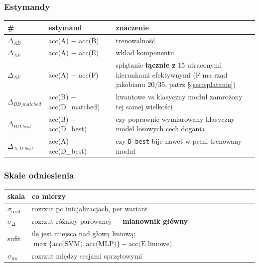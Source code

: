 \documentclass[11pt, a4paper]{article}
\begin{document}
\subsubsection{Estymandy}

\begin{table}[H]
\centering
\renewcommand{\arraystretch}{1.3}
\begin{tabularx}{\textwidth}{lXX}
\toprule
\textbf{\#} & \textbf{estymand} & \textbf{znaczenie} \\
\midrule
$\Delta_{AB}$ & acc(A) $-$ acc(B) & trenowalność \\
$\Delta_{AE}$ & acc(A) $-$ acc(E) & wkład komponentu \\
$\Delta_{AF}$ & acc(A) $-$ acc(F) & splątanie \textbf{łącznie z} 15 utraconymi kierunkami efektywnymi (F ma rząd jakobianu 20/35, patrz \S\ref{sec:splatanie}) \\
$\Delta_{BD\_matched}$ & acc(B) $-$ acc(D\_matched) & kwantowe vs klasyczny moduł zamrożony tej samej wielkości\\
$\Delta_{BD\_best}$ & acc(B) $-$ acc(D\_best) & czy poprawnie wymiarowany klasyczny model losowych cech dogania \\
$\Delta_{A,D\_best}$ & acc(A) $-$ acc(D\_best) & czy \texttt{D\_best} bije nawet w pełni trenowany moduł \\
\bottomrule
\end{tabularx}
\end{table}

\subsubsection{Skale odniesienia}\label{sec:skale}

\begin{table}[H]
\centering
\renewcommand{\arraystretch}{1.3}
\begin{tabularx}{\textwidth}{lX}
\toprule
\textbf{skala} & \textbf{co mierzy} \\
\midrule
$\sigma_{\text{seed}}$ & rozrzut po inicjalizacjach, per wariant \\
$\sigma_{\Delta}$ & rozrzut różnicy parowanej --- \textbf{mianownik główny} \\
sufit & ile jest miejsca nad głową liniową; $\max\{\text{acc(SVM)}, \text{acc(MLP)}\} - \text{acc(E liniowe)}$ \\
$\sigma_{\text{hw}}$ & rozrzut między sesjami sprzętowymi \\
\bottomrule
\end{tabularx}
\end{table}
\end{document}
